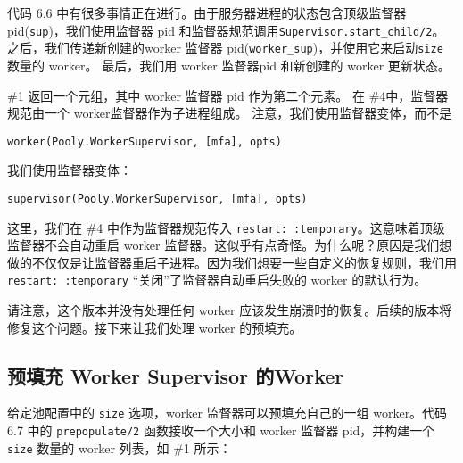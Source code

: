 代码 6.6 中有很多事情正在进行。由于服务器进程的状态包含顶级监督器 pid(\texttt{sup})，我们使用监督器 pid 和监督器规范调用\texttt{Supervisor.start\_child/2}。
之后，我们传递新创建的worker 监督器 pid(\texttt{worker\_sup})，并使用它来启动\texttt{size} 数量的 worker。
最后，我们用 worker 监督器pid 和新创建的 worker 更新状态。

\#1 返回一个元组，其中 worker 监督器 pid 作为第二个元素。
在 \#4中，监督器规范由一个 worker监督器作为子进程组成。
注意，我们使用监督器变体，而不是

\begin{code}{}
\begin{verbatim}
worker(Pooly.WorkerSupervisor, [mfa], opts)
\end{verbatim}
\end{code}

我们使用监督器变体：

\begin{code}{}
\begin{verbatim}
supervisor(Pooly.WorkerSupervisor, [mfa], opts)
\end{verbatim}
\end{code}

这里，我们在 \#4 中作为监督器规范传入
\texttt{restart: :temporary}。这意味着顶级监督器不会自动重启
worker
监督器。这似乎有点奇怪。为什么呢？原因是我们想做的不仅仅是让监督器重启子进程。因为我们想要一些自定义的恢复规则，我们用
\texttt{restart: :temporary}
``关闭''了监督器自动重启失败的 worker 的默认行为。

请注意，这个版本并没有处理任何 worker
应该发生崩溃时的恢复。后续的版本将修复这个问题。接下来让我们处理 worker
的预填充。


\subsection{预填充 Worker Supervisor 的Worker}

给定池配置中的 \texttt{size} 选项，worker
监督器可以预填充自己的一组 worker。代码 6.7 中的
\texttt{prepopulate/2} 函数接收一个大小和 worker 监督器
pid，并构建一个 \texttt{size} 数量的 worker 列表，如
\#1 所示：

